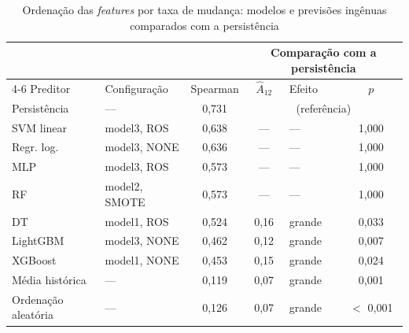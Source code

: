 \begin{table}[htbp]
    
    \centering
    \footnotesize
    \setlength{\tabcolsep}{4pt}%
    \caption{Ordenação das \textit{features} por taxa de mudança: modelos e previsões ingênuas comparados com a persistência}
    \label{tab:res-nivel-feature-persistencia}
    \begin{tabular}{llcclc}
        \toprule
         & & & \multicolumn{3}{c}{Comparação com a persistência} \\
        \cmidrule(lr){4-6}
        Preditor & Configuração & Spearman & $\hat{A}_{12}$ & Efeito & $p$ \\
        \midrule
        Persistência & --- & 0,731 & \multicolumn{3}{c}{(referência)} \\
        \midrule
        SVM linear & model3, ROS & 0,638 & --- & --- & 1,000 \\
        Regr. log. & model3, NONE & 0,636 & --- & --- & 1,000 \\
        MLP & model3, ROS & 0,573 & --- & --- & 1,000 \\
        RF & model2, SMOTE & 0,573 & --- & --- & 1,000 \\
        DT & model1, ROS & 0,524 & 0,16 & grande & 0,033 \\
        LightGBM & model3, NONE & 0,462 & 0,12 & grande & 0,007 \\
        XGBoost & model1, NONE & 0,453 & 0,15 & grande & 0,024 \\
        \midrule
        Média histórica & --- & 0,119 & 0,07 & grande & 0,001 \\
        Ordenação aleatória & --- & 0,126 & 0,07 & grande & $<$ 0,001 \\
        \bottomrule
    \end{tabular}
\end{table}%
